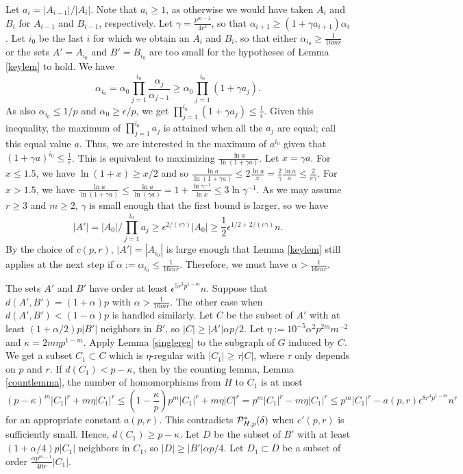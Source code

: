 \documentclass[11pt]{article}
\begin{document}
Let $a_i=|A_{i-1}|/|A_i|$. Note that $a_i \geq 1$, as otherwise we would have taken $A_i$ and $B_i$ for $A_{i-1}$ and $B_{i-1}$, respectively. Let $\gamma=\frac{p^{m-1}}{4r^3}$, so that $\alpha_{i+1} \geq (1+\gamma a_{i+1})\alpha_i$. Let $i_0$ be the last $i$ for which we obtain an $A_i$ and $B_i$, so that either $\alpha_{i_0}  \geq \frac{1}{16mr}$ or the sets $A'=A_{i_0}$ and $B'=B_{i_0}$ are too small for the hypotheses of Lemma \ref{keylem} to hold. We have 
$$\alpha_{i_0}=\alpha_0\prod_{j=1}^{i_0} \frac{\alpha_j}{\alpha_{j-1}} \geq \alpha_0 \prod_{j=1}^{i_0} (1+\gamma a_j).$$
As also $\alpha_{i_0}  \leq 1/p$ and $\alpha_0 \geq \epsilon/p$, we get $\prod_{j=1}^{i_0} (1+\gamma a_j) \leq \frac{1}{\epsilon}$. Given this inequality, the maximum of $\prod_{j=1}^{i_0} a_j$ is attained when all the $a_j$ are equal; call this equal value $a$. Thus, we are interested in the maximum of $a^{i_0}$ given that $(1+\gamma a)^{i_0} \leq \frac{1}{\epsilon}$. This is equivalent to maximizing $\frac{\ln a}{\ln (1+\gamma a)}$. Let $x=\gamma a$. For $x \leq 1.5$, we have $\ln (1+x) \geq x/2$ and so $\frac{\ln a}{\ln (1+\gamma a)} \leq 2\frac{\ln a}{x} = \frac{2}{\gamma}\frac{\ln a}{a} \leq \frac{2}{e\gamma}$. For $x > 1.5$, we have $\frac{\ln a}{\ln (1+\gamma a)}\leq \frac{\ln a}{\ln (\gamma a)}=1+\frac{\ln \gamma^{-1}}{\ln x} \leq 3\ln \gamma^{-1}$. As we may assume $r \geq 3$ and $m \geq 2$, $\gamma$ is small enough that the first bound is larger, so we have $$|A'|=|A_0|/\prod_{j=1}^{i_0} a_j \geq \epsilon^{2/(e\gamma)}|A_0| \geq \frac{1}{2}\epsilon^{1/2 + 2/(e\gamma)}n.$$ 
By the choice of $c(p,r)$, $|A'|=|A_{i_0}|$ is large enough that Lemma \ref{keylem} still applies at the next step if $\alpha:=\alpha_{i_0} \leq \frac{1}{16mr}$. Therefore, we must have $\alpha >  \frac{1}{16mr}$.

The sets $A'$ and $B'$ have order at least $\epsilon^{5r^3p^{1-m}}n$. Suppose  that $d(A',B') = (1+\alpha)p$ with $\alpha > \frac{1}{16mr}$. The other case when $d(A',B') < (1 - \alpha)p$ is handled similarly. Let $C$ be the subset of $A'$ with at least $(1+\alpha/2)p|B'|$ neighbors in $B'$, so $|C| \geq |A'|\alpha p/2$. Let $\eta:=10^{-5}\alpha^2p^{2m}m^{-2}$ and $\kappa=2m\eta p^{1-m}$. Apply Lemma \ref{singlereg} to the subgraph of $G$ induced by $C$. We get a subset $C_1 \subset C$  which is $\eta$-regular with $|C_1| \geq \tau|C|$, where $\tau$ only depends on $p$ and $r$. If 
$d(C_1)<p-\kappa$, then by the counting lemma, Lemma \ref{countlemma}, the number of homomorphisms from $H$ to $C_1$ is at most  $$(p-\kappa)^{m}|C_1|^r+m \eta|C_1|^r \leq (1-\frac{\kappa}{p})p^m|C_1|^r +m \eta|C|^r = p^m|C_1|^r-m\eta|C_1|^r \leq 
p^m|C_1|^r - a(p,r) \epsilon^{8r^4p^{1-m}}n^r$$  
for an appropriate constant $a(p,r)$. This contradicts ${\cal P}^*_{H,p}(\delta)$ when $c'(p,r)$ is sufficiently small. Hence, $d(C_1) \geq p-\kappa$. Let $D$ be the subset of $B'$ with at least $(1+\alpha/4)p|C_1|$ neighbors in $C_1$, so $|D| \geq |B'|\alpha p/4$. Let $D_1 \subset D$ be  a subset of order $\frac{\alpha p^{m-1}}{40r}|C_1|$. 
\end{document}
